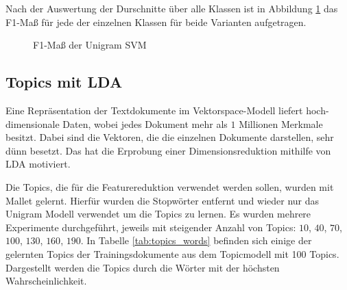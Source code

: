Nach der Auswertung der Durschnitte über alle Klassen ist in Abbildung \ref{fig:svm_text_eval} das F1-Maß für jede der einzelnen
Klassen für beide Varianten aufgetragen.

\begin{figure}[H]
    \centering
    \def\svgwitdth{0.1\columnwidth}
    
    \caption{F1-Maß der Unigram SVM}
    \label{fig:svm_text_eval}
\end{figure}


\subsection{Topics mit LDA}
\label{sub:topics}
Eine Repräsentation der Textdokumente im Vektorspace-Modell liefert hoch-dimensionale Daten, wobei jedes Dokument mehr als $1$ Millionen Merkmale besitzt.
Dabei sind die Vektoren, die die einzelnen Dokumente darstellen, sehr dünn besetzt.
Das hat die Erprobung einer Dimensionsreduktion mithilfe von LDA motiviert.

Die Topics, die für die Featurereduktion verwendet werden sollen, wurden mit Mallet \cite{McCallumMALLET} gelernt.
Hierfür wurden die Stopwörter entfernt und wieder nur das Unigram Modell verwendet um die Topics zu lernen.
Es wurden mehrere Experimente durchgeführt, jeweils mit steigender Anzahl von Topics: $10$, $40$, $70$, $100$, $130$, $160$, $190$.
In Tabelle \ref{tab:topics_words} befinden sich einige der gelernten Topics der Trainingsdokumente aus dem Topicmodell mit 100 Topics.
Dargestellt werden die Topics durch die Wörter mit der höchsten Wahrscheinlichkeit.

